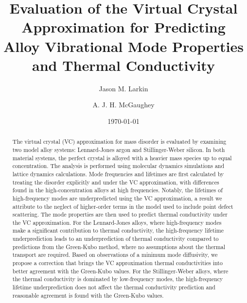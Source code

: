 \documentclass[12pt,twocolumn,iop]{/usr/share/texmf-texlive/tex/latex/iop/iopart}[/usr/share/texmf-texlive/tex/latex/iop/]
\begin{document}

\title{Evaluation of the Virtual Crystal Approximation for Predicting Alloy 
Vibrational Mode Properties and Thermal Conductivity}
\author{Jason M. Larkin}
\author{A. J. H. McGaughey}

\date{\today}


\begin{abstract}
The virtual crystal (VC) approximation for mass disorder is evaluated by
examining two model alloy systems: Lennard-Jones argon and Stillinger-Weber
silicon. 
In both material systems, the perfect crystal is alloyed with a heavier mass
species up to equal concentration.
The analysis is performed using molecular dynamics simulations and lattice
dynamics calculations.
Mode frequencies and lifetimes are first calculated by treating the disorder
explicitly and under the VC approximation, with differences found in the
high-concentration alloys at high frequencies. 
Notably, the lifetimes of high-frequency modes are underpredicted using the
VC approximation, a result we attribute to the neglect of higher-order terms 
in the model used to include point defect scattering.
The mode properties are then used to predict thermal conductivity under the
VC approximation.
For the Lennard-Jones alloys, where high-frequency modes make a significant
contribution to thermal conductivity, the high-frequency lifetime
underprediction leads to an underprediction of thermal conductivity compared
to predictions from the Green-Kubo method, where no assumptions about the
thermal transport are required.
Based on observations of a minimum mode diffusivity, we propose a correction
that brings the VC approximation thermal conductivities into better 
agreement with the Green-Kubo values. 
For the Stillinger-Weber alloys, where the thermal conductivity is dominated
by low-frequency modes, the high-frequency lifetime underprediction does not
affect the thermal conductivity prediction and reasonable agreement is found
with the Green-Kubo values. 
\end{abstract}
\end{document}
